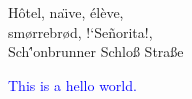 \documentclass{article}
\begin{document}
H\^otel, na\"\i ve, \'el\`eve,\\
sm\o rrebr\o d, !`Se\~norita!,\\
Sch\''onbrunner Schlo\ss{}
Stra\ss e

\textcolor{blue}{This is a hello world.}
\end{document}
